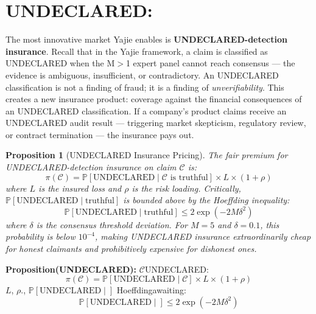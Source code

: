 \documentclass[12pt,a4paper]{article}
\newtheorem{proposition}[theorem]{Proposition}
\theoremstyle{remark}
\newcommand{\Pbb}{\mathbb{P}}
\begin{document}
\section{UNDECLARED:}
The most innovative market Yajie enables is \textbf{UNDECLARED-detection insurance}. 
Recall that in the Yajie framework, a claim is classified as UNDECLARED when the M$>$1 
expert panel cannot reach consensus --- the evidence is ambiguous, insufficient, or 
contradictory. An UNDECLARED classification is not a finding of fraud; it is a finding 
of \textit{unverifiability}.
This creates a new insurance product: coverage against the financial consequences of an 
UNDECLARED classification. If a company's product claims receive an UNDECLARED audit 
result --- triggering market skepticism, regulatory review, or contract termination --- the 
insurance pays out.
\begin{proposition}[UNDECLARED Insurance Pricing]
The fair premium for UNDECLARED-detection insurance on claim $\mathcal{C}$ is:
\begin{equation}
 \pi(\mathcal{C}) = \Pbb[\text{UNDECLARED} \mid \mathcal{C} \text{ is truthful}] 
 \times L \times (1 + \rho)
\end{equation}
where $L$ is the insured loss and $\rho$ is the risk loading. Critically, 
$\Pbb[\text{UNDECLARED} \mid \text{truthful}]$ is bounded above by the Hoeffding 
inequality:
\begin{equation}
 \Pbb[\text{UNDECLARED} \mid \text{truthful}] \leq 2\exp(-2M\delta^2)
\end{equation}
where $\delta$ is the consensus threshold deviation. For $M=5$ and $\delta=0.1$, this 
probability is below $10^{-4}$, making UNDECLARED insurance extraordinarily cheap for 
honest claimants and prohibitively expensive for dishonest ones.
\end{proposition}
\medskip
\textbf{Proposition(UNDECLARED): }
$\mathcal{C}$UNDECLARED: 
\begin{equation}
 \pi(\mathcal{C}) = \Pbb[\text{UNDECLARED} \mid \mathcal{C} \text{}] 
 \times L \times (1 + \rho)
\end{equation}
$L$, $\rho$., $\Pbb[\text{UNDECLARED} \mid \text{}]$
Hoeffdingawaiting: 
\begin{equation}
 \Pbb[\text{UNDECLARED} \mid \text{}] \leq 2\exp(-2M\delta^2)
\end{equation}
\end{document}
